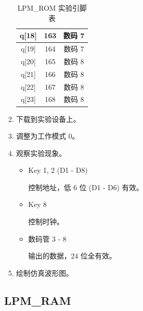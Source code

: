 \begin{enumerate}
\begin{table}[H]
\begin{tabular}{|c|c|c|}
            q[18] & 163 & 数码 7 \\
            \hline
            q[19] & 164 & 数码 7 \\
            \hline
            q[20] & 165 & 数码 8 \\
            \hline
            q[21] & 166 & 数码 8 \\
            \hline
            q[22] & 167 & 数码 8 \\
            \hline
            q[23] & 168 & 数码 8 \\
            \hline
        \end{tabular}
        \caption{LPM\_ROM 实验引脚表}
        \label{tab:pin2_1}
    \end{table}
    
    
    \item 下载到实验设备上。
    \item 调整为工作模式 0。
    \item 观察实验现象。
    
    \begin{itemize}
        \item Key 1, 2 (D1 - D8)
        
        控制地址，低 6 位 (D1 - D6) 有效。
        
        \item Key 8
        
        控制时钟。
        
        \item 数码管 3 - 8
        
        输出的数据，24 位全有效。
        
    \end{itemize}
    \item 绘制仿真波形图。
\end{enumerate}

\subsection{LPM\_RAM}


